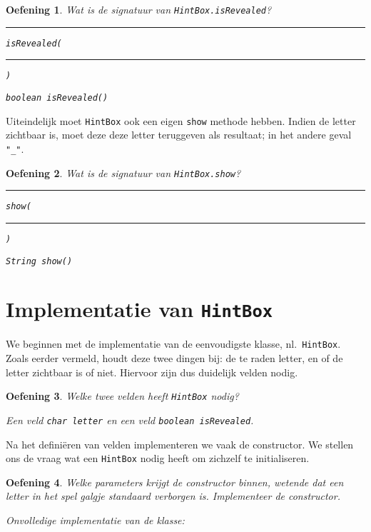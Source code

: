 \documentclass[a4paper,dutch]{article}
\newtheorem{exercise}{Oefening}[section]
\newcommand{\code}[2][]{
  
}
\begin{document}
\begin{exercise}
Wat is de signatuur van {\tt HintBox.isRevealed}?
\begin{center}
  \rule{2cm}{.5pt} {\tt isRevealed(}\rule{4cm}{.5pt}{\tt)}
\end{center}
\begin{solution}
\tt boolean isRevealed()
\end{solution}
\end{exercise}

Uiteindelijk moet {\tt HintBox} ook een eigen {\tt show} methode hebben. Indien
de letter zichtbaar is, moet deze deze letter teruggeven als resultaat;
in het andere geval \verb'"_"'.

\begin{exercise}
Wat is de signatuur van {\tt HintBox.show}?
\begin{center}
  \rule{2cm}{.5pt} {\tt show(}\rule{4cm}{.5pt}{\tt)}
\end{center}
\begin{solution}
\tt String show()
\end{solution}
\end{exercise}

\section{Implementatie van {\tt HintBox}}
We beginnen met de implementatie van de eenvoudigste klasse, nl.\ {\tt HintBox}.
Zoals eerder vermeld, houdt deze twee dingen bij: de te raden letter, en of de letter
zichtbaar is of niet. Hiervoor zijn dus duidelijk velden nodig.

\begin{exercise}
Welke twee velden heeft {\tt HintBox} nodig?
\begin{solution}
Een veld {\tt char letter} en een veld {\tt boolean isRevealed}.
\end{solution}
\end{exercise}

Na het defini\"eren van velden implementeren we vaak de constructor.
We stellen ons de vraag wat een {\tt HintBox} nodig heeft om zichzelf
te initialiseren.

\begin{exercise}
Welke parameters krijgt de constructor binnen,
wetende dat een letter in het spel galgje standaard verborgen is.
Implementeer de constructor.
\begin{solution}
Onvolledige implementatie van de klasse:
\code{hintbox-constructor.java}
\end{solution}
\end{exercise}
\end{document}
